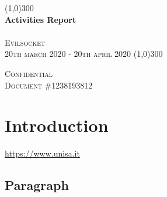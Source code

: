 \documentclass{article}
\begin{document}


\begin{titlepage}

    \begin{center}
        \line(1,0){300} \\ 
        
        \huge{\bfseries Activities Report}\\
        \textsc{\normalsize \\Evilsocket \\20th march 2020 - 20th april 2020}
        \line(1,0){300} \\ 
    \end{center}

    \vspace{10cm}

    \begin{flushright}
       \textsc{\normalsize Confidential\\Document \#1238193812} 
    \end{flushright}
    
\end{titlepage}

\tableofcontents
\section{Introduction}\label{sec:intro}
\url{https://www.unisa.it}

\subsection{Paragraph}
\end{document}
